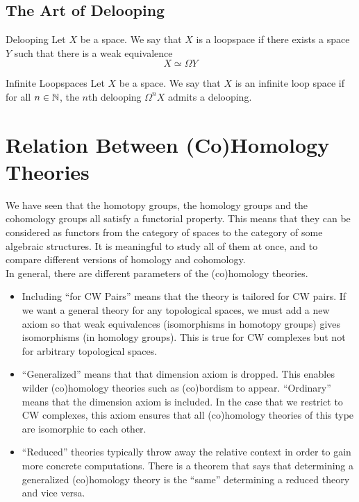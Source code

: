 \documentclass[a4paper]{article}
\begin{document}
\subsection{The Art of Delooping}
\begin{defn}{Delooping}{} Let $X$ be a space. We say that $X$ is a loopspace if there exists a space $Y$ such that there is a weak equivalence $$X\simeq\Omega Y$$
\end{defn}

\begin{defn}{Infinite Loopspaces}{} Let $X$ be a space. We say that $X$ is an infinite loop space if for all $n\in\mathbb{N}$, the $n$th delooping $\Omega^n X$ admits a delooping. 
\end{defn}

\pagebreak
\section{Relation Between (Co)Homology Theories}
We have seen that the homotopy groups, the homology groups and the cohomology groups all satisfy a functorial property. This means that they can be considered as functors from the category of spaces to the category of some algebraic structures. It is meaningful to study all of them at once, and to compare different versions of homology and cohomology. \\

In general, there are different parameters of the (co)homology theories. 
\begin{itemize}
\item Including ``for CW Pairs'' means that the theory is tailored for CW pairs. If we want a general theory for any topological spaces, we must add a new axiom so that weak equivalences (isomorphisms in homotopy groups) gives isomorphisms (in homology groups). This is true for CW complexes but not for arbitrary topological spaces. 
\item ``Generalized'' means that that dimension axiom is dropped. This enables wilder (co)homology theories such as (co)bordism to appear. ``Ordinary'' means that the dimension axiom is included. In the case that we restrict to CW complexes, this axiom ensures that all (co)homology theories of this type are isomorphic to each other. 
\item ``Reduced'' theories typically throw away the relative context in order to gain more concrete computations. There is a theorem that says that determining a generalized (co)homology theory is the ``same'' determining a reduced theory and vice versa. 
\end{itemize}
\end{document}

